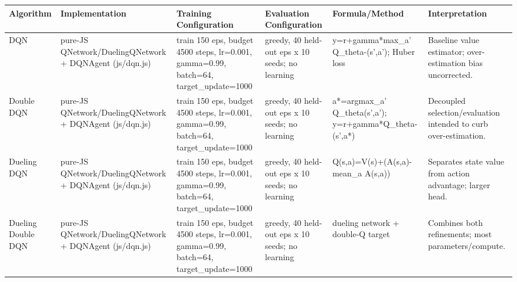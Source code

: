 \begin{tabular}{llllll}
\toprule
Algorithm & Implementation & Training Configuration & Evaluation Configuration & Formula/Method & Interpretation \\
\midrule
DQN & pure-JS QNetwork/DuelingQNetwork + DQNAgent (js/dqn.js) & train 150 eps, budget 4500 steps, lr=0.001, gamma=0.99, batch=64, target\_update=1000 & greedy, 40 held-out eps x 10 seeds; no learning & y=r+gamma*max\_a' Q\_theta-(s',a'); Huber loss & Baseline value estimator; over-estimation bias uncorrected. \\
Double DQN & pure-JS QNetwork/DuelingQNetwork + DQNAgent (js/dqn.js) & train 150 eps, budget 4500 steps, lr=0.001, gamma=0.99, batch=64, target\_update=1000 & greedy, 40 held-out eps x 10 seeds; no learning & a*=argmax\_a' Q\_theta(s',a'); y=r+gamma*Q\_theta-(s',a*) & Decoupled selection/evaluation intended to curb over-estimation. \\
Dueling DQN & pure-JS QNetwork/DuelingQNetwork + DQNAgent (js/dqn.js) & train 150 eps, budget 4500 steps, lr=0.001, gamma=0.99, batch=64, target\_update=1000 & greedy, 40 held-out eps x 10 seeds; no learning & Q(s,a)=V(s)+(A(s,a)-mean\_a A(s,a)) & Separates state value from action advantage; larger head. \\
Dueling Double DQN & pure-JS QNetwork/DuelingQNetwork + DQNAgent (js/dqn.js) & train 150 eps, budget 4500 steps, lr=0.001, gamma=0.99, batch=64, target\_update=1000 & greedy, 40 held-out eps x 10 seeds; no learning & dueling network + double-Q target & Combines both refinements; most parameters/compute. \\
\bottomrule
\end{tabular}
